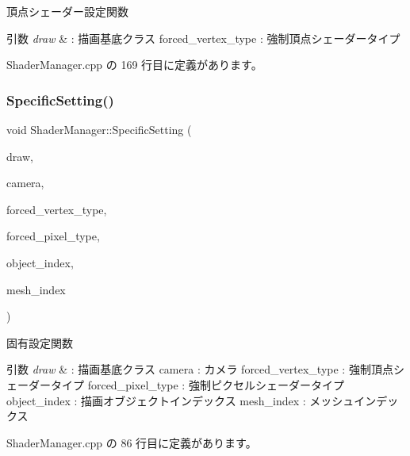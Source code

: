 頂点シェーダー設定関数 


\begin{DoxyParams}{引数}
{\em draw} & \+: 描画基底クラス forced\+\_\+vertex\+\_\+type \+: 強制頂点シェーダータイプ \\
\hline
\end{DoxyParams}


 Shader\+Manager.\+cpp の 169 行目に定義があります。

\mbox{\label{class_shader_manager_af016392b9b0477d49165d753e9404ff4}} 
\subsubsection{\texorpdfstring{Specific\+Setting()}{SpecificSetting()}}
{\footnotesize\ttfamily void Shader\+Manager\+::\+Specific\+Setting (\begin{DoxyParamCaption}\item[{\mbox{\hyperlink{class_draw_base}{Draw\+Base}} $\ast$}]{draw,  }\item[{\mbox{\hyperlink{class_camera}{Camera}} $\ast$}]{camera,  }\item[{\mbox{\hyperlink{class_shader_manager_a9b51e49d70eb3cc58f6d1f3994e8cfbd}{Vertex\+Shader\+Type}}}]{forced\+\_\+vertex\+\_\+type,  }\item[{\mbox{\hyperlink{class_shader_manager_a7d15d773b3c6a99dd7086c45c8b0be5f}{Pixel\+Shader\+Type}}}]{forced\+\_\+pixel\+\_\+type,  }\item[{unsigned}]{object\+\_\+index,  }\item[{unsigned}]{mesh\+\_\+index }\end{DoxyParamCaption})}



固有設定関数 


\begin{DoxyParams}{引数}
{\em draw} & \+: 描画基底クラス camera \+: カメラ forced\+\_\+vertex\+\_\+type \+: 強制頂点シェーダータイプ forced\+\_\+pixel\+\_\+type \+: 強制ピクセルシェーダータイプ object\+\_\+index \+: 描画オブジェクトインデックス mesh\+\_\+index \+: メッシュインデックス \\
\hline
\end{DoxyParams}


 Shader\+Manager.\+cpp の 86 行目に定義があります。

